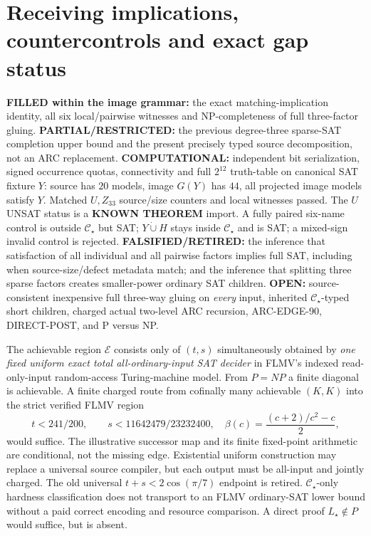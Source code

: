 \documentclass[11pt]{article}
\newcommand{\CS}{\mathcal C_{\star}}
\begin{document}
\section{Receiving implications, countercontrols and exact gap status}
\noindent\textbf{FILLED within the image grammar:} the exact matching-implication identity, all six local/pairwise witnesses and NP-completeness of full three-factor gluing. \textbf{PARTIAL/RESTRICTED:} the previous degree-three sparse-SAT completion upper bound and the present precisely typed source decomposition, not an ARC replacement. \textbf{COMPUTATIONAL:} independent bit serialization, signed occurrence quotas, connectivity and full $2^{12}$ truth-table on canonical SAT fixture $Y$: source has $20$ models, image $G(Y)$ has $44$, all projected image models satisfy $Y$. Matched $U,Z_{33}$ source/size counters and local witnesses passed. The $U$ UNSAT status is a \textbf{KNOWN THEOREM} import. A fully paired six-name control is outside $\CS$ but SAT; $Y\dot\cup H$ stays inside $\CS$ and is SAT; a mixed-sign invalid control is rejected.
\noindent\textbf{FALSIFIED/RETIRED:} the inference that satisfaction of all individual and all pairwise factors implies full SAT, including when source-size/defect metadata match; and the inference that splitting three sparse factors creates smaller-power ordinary SAT children. \textbf{OPEN:} source-consistent inexpensive full three-way gluing on \emph{every} input, inherited $\CS$-typed short children, charged actual two-level ARC recursion, ARC-EDGE-90, DIRECT-POST, and P versus NP.

The achievable region $\mathcal E$ consists only of $(t,s)$ simultaneously obtained by \emph{one fixed uniform exact total all-ordinary-input SAT decider} in FLMV's indexed read-only-input random-access Turing-machine model. From $P=NP$ a finite diagonal is achievable. A finite charged route from cofinally many achievable $(K,K)$ into the strict verified FLMV region
\[
\boxed{t<241/200,\qquad s<11642479/23232400},\quad
\beta(c)=\frac{(c+2)/c^2-c}{2},
\]
would suffice. The illustrative successor map and its finite fixed-point arithmetic are conditional, not the missing edge. Existential uniform construction may replace a universal source compiler, but each output must be all-input and jointly charged. The old universal $t+s<2\cos(\pi/7)$ endpoint is retired. $\CS$-only hardness classification does not transport to an FLMV ordinary-SAT lower bound without a paid correct encoding and resource comparison. A direct proof $L_\star\notin P$ would suffice, but is absent.
\end{document}
